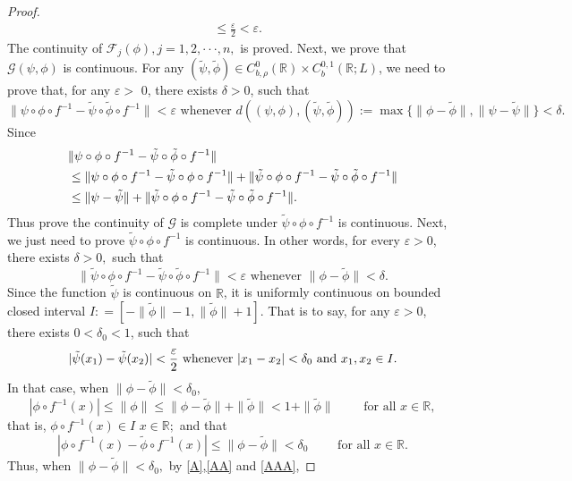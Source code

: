 \documentclass[10pt,a4paper]{amsart}
\renewcommand{\epsilon}{\varepsilon}
\begin{document}
\begin{proof}
\begin{align*}
  &\le \frac{\epsilon}{2} < \epsilon.
  \end{align*}
  The continuity of $\mathcal{F}_j(\phi), j=1,2,\cdot \cdot \cdot,n,$ is proved.  
  Next, we prove that $\mathcal{G} (\psi,\phi)$ is continuous. For any $(\tilde{\psi},\tilde{\phi}) \in C_{b,\rho}^{0} (\mathbb{R}) \times C_{b}^{0,1} (\mathbb{R};L)$, we need to prove that, for any $\epsilon >$ 0, there exists $\delta >0$, such that
  $$\|\psi \circ \phi \circ f^{-1}-\tilde{\psi} \circ \tilde{\phi} \circ f^{-1}\| < \epsilon \text{ whenever } d((\psi,\phi),(\tilde{\psi},\tilde{\phi})):=\max\{\| \phi-\tilde \phi\|,\| \psi-\tilde \psi\|\}<\delta.$$
Since 
\begin{align}
    &\|\psi \circ \phi \circ f^{-1}-\tilde{\psi} \circ \tilde{\phi} \circ f^{-1}\|\notag\\ 
    &\le \|\psi \circ \phi \circ f^{-1}-\tilde{\psi} \circ \phi \circ f^{-1}\|+\|\tilde{\psi} \circ \phi \circ f^{-1}-\tilde{\psi} \circ \tilde{\phi} \circ f^{-1}\|\notag\\
    &\le \|\psi-\tilde \psi\|+\|\tilde{\psi} \circ \phi \circ f^{-1}-\tilde{\psi} \circ \tilde{\phi} \circ f^{-1}\|. \notag
\end{align}
Thus prove the continuity of $\mathcal{G}$ is complete under $\tilde{\psi} \circ \phi \circ f^{-1}$ is continuous. Next, we just need to prove $\tilde{\psi} \circ \phi \circ f^{-1}$ is continuous. In other words, for every $\epsilon >0$, there exists $\delta >0,$ such that
$$\|\tilde{\psi} \circ \phi \circ f^{-1}-\tilde{\psi} \circ \tilde{\phi} \circ f^{-1}\| < \epsilon \text{ whenever } \|\phi-\tilde \phi\|<\delta.$$
Since the function $\tilde \psi$ is continuous on $\mathbb{R}$, it is uniformly continuous on bounded closed interval $I: =[-\|\tilde{\phi}\|-1,\|\tilde{\phi}\|+1]$. That is to say, for any $\epsilon >0$, there exists $0<\delta_0 <1$, such that
\begin{equation}\label{A}
    |\tilde \psi(x_1)-\tilde \psi(x_2)| < \frac{\epsilon}{2} \text{ whenever } |x_1-x_2|<\delta_0  \text{ and } x_1,x_2 \in I.\\
\end{equation}
In that case, when $\|\phi-\tilde{\phi}\| < \delta_0$,
\begin{equation}\label{AA}
    |\phi \circ f^{-1}(x)| \le \|\phi\| \le \|\phi-\tilde{\phi}\|+\|\tilde{\phi}\| < 1+ \|\tilde{\phi}\|
\qquad \text{ for all } x \in \mathbb{R},
\end{equation}
that is, $\phi \circ f^{-1}(x) \in I$  \qquad {} $x \in \mathbb{R};$
and that 
\begin{equation}\label{AAA}
    |\phi \circ f^{-1}(x)-\tilde{\phi} \circ f^{-1}(x)| \le \|\phi-\tilde{\phi}\| < \delta_0 \qquad \text{ for all } x \in \mathbb{R}.
\end{equation}
Thus, when $\|\phi-\tilde{\phi}\| < \delta_0, $ by \eqref{A},\eqref{AA} and \eqref{AAA}, 


\end{proof}
\end{document}
